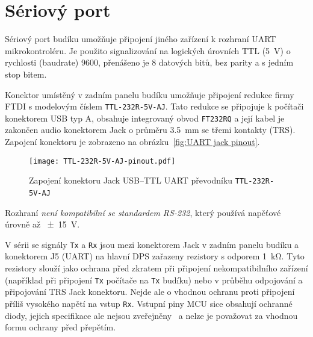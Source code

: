 \section{Sériový port}
Sériový port budíku umožňuje připojení jiného zařízení k rozhraní \acs{UART}
mikrokontroléru. Je použito signalizování na logických úrovních \acs{TTL}
(\SI{5}{\volt}) o rychlosti (\foreignlanguage{english}{baudrate})
\SI{9600}{\baud}, přenášeno je \num{8} datových bitů, bez parity a s jedním
stop bitem.

Konektor umístěný v zadním panelu budíku umožňuje připojení redukce firmy FTDI
s modelovým číslem \texttt{TTL-232R-5V-AJ}. Tato redukce se připojuje
k počítači konektorem USB typ A, obsahuje integrovaný obvod \texttt{FT232RQ}
a její kabel je zakončen audio konektorem Jack o průměru \SI{3,5}{\milli\meter}
se třemi kontakty (TRS). Zapojení konektoru je zobrazeno na
obrázku~\vref{fig:UART jack pinout}.

\begin{figure}[htbp]
    \centering
    \texttt{[image: TTL-232R-5V-AJ-pinout.pdf]}
    \caption{%
        Zapojení konektoru Jack USB--TTL UART převodníku
        \texttt{TTL-232R-5V-AJ}~\cite{TTL-232R}
    }
    \label{fig:UART jack pinout}
\end{figure}

Rozhraní \emph{není kompatibilní se standardem RS-232}, který používá napěťové
úrovně až \SI{\pm15}{\volt}.

V sérii se signály \texttt{Tx} a \texttt{Rx} jsou mezi konektorem Jack v zadním
panelu budíku a konektorem J5 (UART) na hlavní DPS zařazeny rezistory s odporem
\SI{1}{\kilo\ohm}. Tyto rezistory slouží jako ochrana
před zkratem při připojení nekompatibilního zařízení (například při připojení
\texttt{Tx} počítače na \texttt{Tx} budíku) nebo v průběhu odpojování
a připojování TRS Jack konektoru. Nejde ale o vhodnou ochranu proti připojení
příliš vysokého napětí na vstup \texttt{Rx}. Vstupní piny \acs{MCU} sice
obsahují ochranné diody, jejich specifikace ale nejsou
zveřejněny~\cite{dshATmega328} a nelze je považovat za vhodnou formu ochrany
před přepětím.
